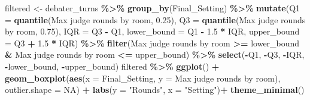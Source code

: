 \documentclass[
]{article}
\newenvironment{Shaded}{\begin{snugshade}}{\end{snugshade}}
\newcommand{\AttributeTok}[1]{\textcolor[rgb]{0.13,0.29,0.53}{#1}}
\newcommand{\ConstantTok}[1]{\textcolor[rgb]{0.56,0.35,0.01}{#1}}
\newcommand{\FloatTok}[1]{\textcolor[rgb]{0.00,0.00,0.81}{#1}}
\newcommand{\FunctionTok}[1]{\textcolor[rgb]{0.13,0.29,0.53}{\textbf{#1}}}
\newcommand{\NormalTok}[1]{#1}
\newcommand{\OtherTok}[1]{\textcolor[rgb]{0.56,0.35,0.01}{#1}}
\newcommand{\SpecialCharTok}[1]{\textcolor[rgb]{0.81,0.36,0.00}{\textbf{#1}}}
\newcommand{\StringTok}[1]{\textcolor[rgb]{0.31,0.60,0.02}{#1}}
\begin{document}
\begin{Shaded}
\begin{Highlighting}[]
\NormalTok{filtered }\OtherTok{\textless{}{-}}\NormalTok{ debater\_turns }\SpecialCharTok{\%\textgreater{}\%}
  \FunctionTok{group\_by}\NormalTok{(Final\_Setting) }\SpecialCharTok{\%\textgreater{}\%}
  \FunctionTok{mutate}\NormalTok{(}\AttributeTok{Q1 =} \FunctionTok{quantile}\NormalTok{(}\StringTok{\textasciigrave{}}\AttributeTok{Max judge rounds by room}\StringTok{\textasciigrave{}}\NormalTok{, }\FloatTok{0.25}\NormalTok{),}
         \AttributeTok{Q3 =} \FunctionTok{quantile}\NormalTok{(}\StringTok{\textasciigrave{}}\AttributeTok{Max judge rounds by room}\StringTok{\textasciigrave{}}\NormalTok{, }\FloatTok{0.75}\NormalTok{),}
         \AttributeTok{IQR =}\NormalTok{ Q3 }\SpecialCharTok{{-}}\NormalTok{ Q1,}
         \AttributeTok{lower\_bound =}\NormalTok{ Q1 }\SpecialCharTok{{-}} \FloatTok{1.5} \SpecialCharTok{*}\NormalTok{ IQR,}
         \AttributeTok{upper\_bound =}\NormalTok{ Q3 }\SpecialCharTok{+} \FloatTok{1.5} \SpecialCharTok{*}\NormalTok{ IQR) }\SpecialCharTok{\%\textgreater{}\%}
  \FunctionTok{filter}\NormalTok{(}\StringTok{\textasciigrave{}}\AttributeTok{Max judge rounds by room}\StringTok{\textasciigrave{}} \SpecialCharTok{\textgreater{}=}\NormalTok{ lower\_bound }\SpecialCharTok{\&} \StringTok{\textasciigrave{}}\AttributeTok{Max judge rounds by room}\StringTok{\textasciigrave{}} \SpecialCharTok{\textless{}=}\NormalTok{ upper\_bound) }\SpecialCharTok{\%\textgreater{}\%}
  \FunctionTok{select}\NormalTok{(}\SpecialCharTok{{-}}\NormalTok{Q1, }\SpecialCharTok{{-}}\NormalTok{Q3, }\SpecialCharTok{{-}}\NormalTok{IQR, }\SpecialCharTok{{-}}\NormalTok{lower\_bound, }\SpecialCharTok{{-}}\NormalTok{upper\_bound)}
\NormalTok{filtered }\SpecialCharTok{\%\textgreater{}\%}
  \FunctionTok{ggplot}\NormalTok{() }\SpecialCharTok{+}
  \FunctionTok{geom\_boxplot}\NormalTok{(}\FunctionTok{aes}\NormalTok{(}\AttributeTok{x =}\NormalTok{ Final\_Setting, }\AttributeTok{y =} \StringTok{\textasciigrave{}}\AttributeTok{Max judge rounds by room}\StringTok{\textasciigrave{}}\NormalTok{), }\AttributeTok{outlier.shape =} \ConstantTok{NA}\NormalTok{) }\SpecialCharTok{+}
  \FunctionTok{labs}\NormalTok{(}\AttributeTok{y =} \StringTok{"Rounds"}\NormalTok{, }\AttributeTok{x =} \StringTok{"Setting"}\NormalTok{)}\SpecialCharTok{+}
  \FunctionTok{theme\_minimal}\NormalTok{()}
\end{Highlighting}
\end{Shaded}
\end{document}
